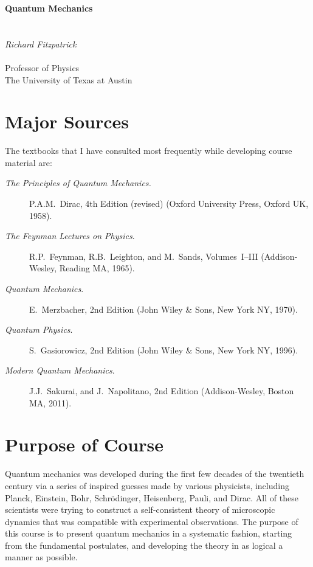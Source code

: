 \thispagestyle{empty}
\begin{center}
{\Huge\bf Quantum Mechanics}\\[1ex]
~\\
~\\
{\Large\em  Richard Fitzpatrick}\\[1.5ex]~\\[1.5ex]
{\Large\sf  Professor  of Physics}\\[1.5ex]
{\Large\sf  The University of Texas at Austin}
\end{center}

\section*{Major Sources}
The textbooks that I have consulted most frequently while developing
course material are:
\begin{description}
\item [\em The Principles of Quantum Mechanics.] P.A.M.~Dirac, 4th Edition (revised)
(Oxford University Press, Oxford UK, 1958).
\item [{\em The Feynman Lectures on Physics}.] R.P.~Feynman, R.B.~Leighton,
and M.~Sands, Volumes~I--III (Addison-Wesley, Reading MA, 1965).
\item [{\em Quantum Mechanics}.] E.~Merzbacher, 2nd Edition (John Wiley \& Sons,
New York NY, 1970).
\item [{\em Quantum Physics}.] S.~Gasiorowicz, 2nd Edition (John Wiley \& Sons, New York NY, 1996).
\item [{\em Modern Quantum Mechanics}.] J.J.~Sakurai, and J.~Napolitano, 2nd Edition (Addison-Wesley, Boston MA, 2011).
\end{description}

\section*{Purpose of Course}
Quantum mechanics was developed during the first few decades of the twentieth century via a series of inspired guesses made
by various physicists,  including Planck, Einstein, Bohr, Schr\"{o}dinger, Heisenberg, Pauli, and Dirac.  All of these scientists were
trying to construct a self-consistent theory of microscopic dynamics that was compatible with experimental observations. 
The purpose of this course is to present quantum mechanics in a systematic fashion, starting from the
fundamental postulates, and developing the theory in as logical a manner as possible. 

